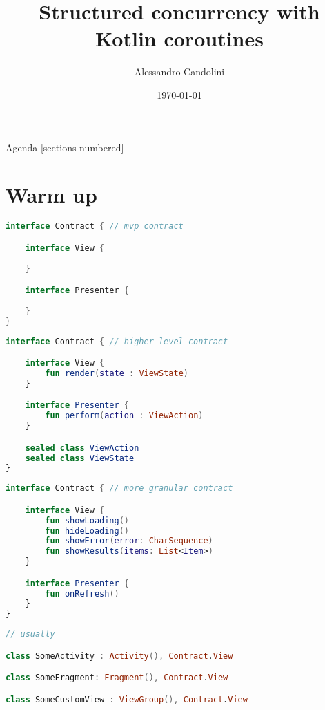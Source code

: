 \documentclass[10pt]{beamer}
\title{Structured concurrency with Kotlin coroutines}
\date{\today}
\author[A. Candolini]{Alessandro Candolini}
\begin{document}
\maketitle

\begin{frame}{Agenda}
  [sections numbered]
  \tableofcontents[hideallsubsections]
\end{frame}

\section{Warm up}


\begin{frame}[fragile]
\begin{lstlisting}[language=Kotlin, basicstyle=\ttfamily]
interface Contract { // mvp contract

    interface View {
    
    }

    interface Presenter {
   
    }
}
\end{lstlisting}
\end{frame}
\begin{frame}[fragile]
\begin{lstlisting}[language=Kotlin, basicstyle=\ttfamily]
interface Contract { // higher level contract 

    interface View {
        fun render(state : ViewState)
    }

    interface Presenter {
        fun perform(action : ViewAction)
    }

    sealed class ViewAction
    sealed class ViewState
}
\end{lstlisting}
\end{frame}

\begin{frame}[fragile]
\begin{lstlisting}[language=Kotlin, basicstyle=\ttfamily]
interface Contract { // more granular contract 

    interface View {
        fun showLoading()
        fun hideLoading()
        fun showError(error: CharSequence)
        fun showResults(items: List<Item>)
    }

    interface Presenter {
        fun onRefresh()
    }
}
\end{lstlisting}
\end{frame}


\begin{frame}[fragile]
\begin{lstlisting}[language=Kotlin, basicstyle=\ttfamily]
// usually  

class SomeActivity : Activity(), Contract.View 

class SomeFragment: Fragment(), Contract.View 

class SomeCustomView : ViewGroup(), Contract.View 

\end{lstlisting}
\end{frame}
\end{document}
